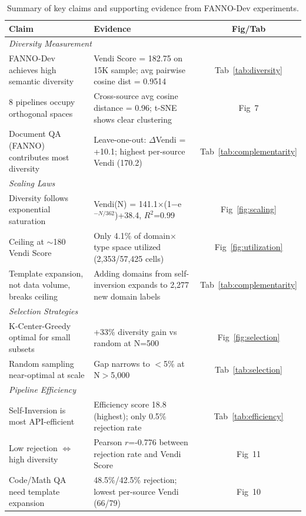 \begin{table}[t]
\centering
\caption{Summary of key claims and supporting evidence from FANNO-Dev experiments.}
\label{tab:claims}
\small
\begin{tabular}{p{}p{}c}
\toprule
\textbf{Claim} & \textbf{Evidence} & \textbf{Fig/Tab} \\
\midrule
\multicolumn{3}{l}{\textit{Diversity Measurement}} \\
\midrule
FANNO-Dev achieves high semantic diversity & Vendi Score = 182.75 on 15K sample; avg pairwise cosine dist = 0.9514 & Tab~\ref{tab:diversity} \\
8 pipelines occupy orthogonal spaces & Cross-source avg cosine distance = 0.96; t-SNE shows clear clustering & Fig~7 \\
Document QA (FANNO) contributes most diversity & Leave-one-out: $\Delta$Vendi = +10.1; highest per-source Vendi (170.2) & Tab~\ref{tab:complementarity} \\
\midrule
\multicolumn{3}{l}{\textit{Scaling Laws}} \\
\midrule
Diversity follows exponential saturation & Vendi(N) = 141.1$\times$(1$-$e$^{-N/362}$)+38.4, $R^2$=0.99 & Fig~\ref{fig:scaling} \\
Ceiling at $\sim$180 Vendi Score & Only 4.1\% of domain$\times$type space utilized (2,353/57,425 cells) & Fig~\ref{fig:utilization} \\
Template expansion, not data volume, breaks ceiling & Adding domains from self-inversion expands to 2,277 new domain labels & Tab~\ref{tab:complementarity} \\
\midrule
\multicolumn{3}{l}{\textit{Selection Strategies}} \\
\midrule
K-Center-Greedy optimal for small subsets & +33\% diversity gain vs random at N=500 & Fig~\ref{fig:selection} \\
Random sampling near-optimal at scale & Gap narrows to $<$5\% at N$>$5,000 & Tab~\ref{tab:selection} \\
\midrule
\multicolumn{3}{l}{\textit{Pipeline Efficiency}} \\
\midrule
Self-Inversion is most API-efficient & Efficiency score 18.8 (highest); only 0.5\% rejection rate & Tab~\ref{tab:efficiency} \\
Low rejection $\Leftrightarrow$ high diversity & Pearson $r$=-0.776 between rejection rate and Vendi Score & Fig~11 \\
Code/Math QA need template expansion & 48.5\%/42.5\% rejection; lowest per-source Vendi (66/79) & Fig~10 \\

\end{tabular}
\end{table}
